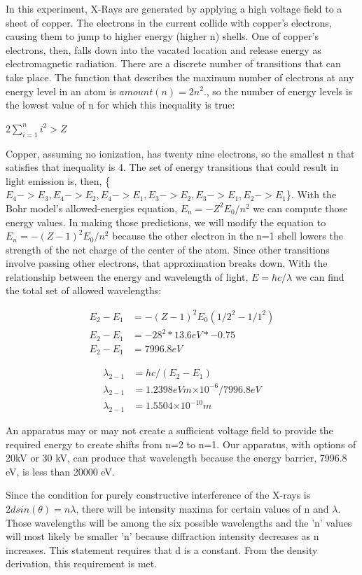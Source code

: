 \documentclass{article}
\providecommand{\e}[1]{\ensuremath{\times 10^{#1}}}
\begin{document}
In this experiment, X-Rays are generated by applying a high voltage field to a sheet of copper. The electrons in the current collide with copper's electrons, causing them to jump to higher energy (higher n) shells. One of copper's electrons, then, falls down into the vacated location and release energy as electromagnetic radiation. There are a discrete number of transitions that can take place. The function that describes the maximum number of electrons at any energy level in an atom is $amount(n) = 2n^2.$, so the number of energy levels is the lowest value of n for which this inequality is true: 

$ 2 \sum_{i=1}^{n} i^2 > Z $

Copper, assuming no ionization, has twenty nine electrons, so the smallest n that satisfies that inequality is 4. The set of energy transitions that could result in light emission is, then, \{$E_4 -> E_3, E_4 -> E_2, E_4 -> E_1, E_3 -> E_2, E_3 -> E_1, E_2 -> E_1$\}. With the Bohr model's allowed-energies equation, $E_n = -Z^2E_0 / n^2$ we can compute those energy values. In making those predictions, we will modify the equation to $E_n = -(Z-1)^2E_0 / n^2$ because the other electron in the n=1 shell lowers the strength of the net charge of the center of the atom. Since other transitions involve passing other electrons, that approximation breaks down. With the relationship between the energy and wavelength of light, $E = hc/\lambda$ we can find the total set of allowed wavelengths:

\begin{align*}
E_2 - E_1 &= -(Z - 1)^2 E_0 ( 1/2^2 - 1/1^2) \\
E_2 - E_1 &= -28^2 * 13.6eV * -0.75 \\
E_2 - E_1 &= 7996.8 eV
\end{align*}

\begin{align*}
\lambda_{2-1} &= hc / (E_2 - E_1) \\
\lambda_{2-1} &= 1.2398 eVm\e{-6} / 7996.8 eV \\
\lambda_{2-1} &= 1.5504\e{-10} m
\end{align*}

An apparatus may or may not create a sufficient voltage field to provide the required energy to create shifts from n=2 to n=1. Our apparatus, with options of 20kV or 30 kV, can produce that wavelength because the energy barrier, 7996.8 eV, is less than 20000 eV. 

Since the condition for purely constructive interference of the X-rays is $2d sin(\theta) = n \lambda$, there will be intensity maxima for certain values of n and $\lambda$. Those wavelengths will be among the six possible wavelengths and the 'n' values will most likely be smaller 'n' because diffraction intensity decreases as n increases. This statement requires that d is a constant. From the density derivation, this requirement is met. 
\end{document}
